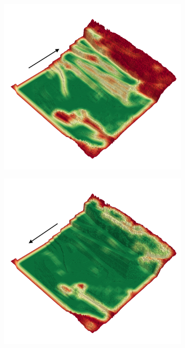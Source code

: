 \documentclass[../document.tex]{subfiles}
\begin{document}
\begin{figure}[H]
\centering
\begin{subfigure}[b]{0.45\textwidth}
  \includegraphics[width=\linewidth]{../img/4/traversability/quarry/-270.png} 
\end{subfigure}
\begin{subfigure}[b]{0.45\textwidth}
    \includegraphics[width=\linewidth]{../img/4/traversability/quarry/-90.png}

\end{subfigure}
\end{figure}
\end{document}
